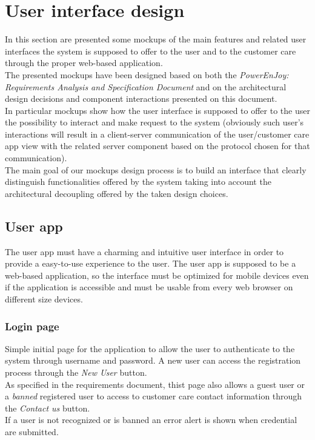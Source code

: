 \section{User interface design}
In this section are presented some mockups of the main features and related user interfaces the system is supposed to offer to the user and to the customer care through the proper web-based application. \\

The presented mockups have been designed based on both the \emph{PowerEnJoy: Requirements Analysis and Specification Document}\cite{RASD} and on the architectural design decisions and component interactions presented on this document. \\
In particular mockups show how the user interface is supposed to offer to the user the possibility to interact and make request to the system (obviously such user's interactions will result in a client-server communication of the user/customer care app view with the related server component based on the protocol chosen for that communication).  \\

The main goal of our mockups design process is to build an interface that clearly distinguish functionalities offered by the system taking into account the architectural decoupling offered by the taken design choices. \\

\clearpage

\subsection{User app}
The user app must have a charming and intuitive user interface in order to provide a easy-to-use experience to the user. The user app is supposed to be a web-based application, so the interface must be optimized for mobile devices even if the application is accessible and must be usable from every web browser on different size devices.

\subsubsection{Login page}
Simple initial page for the application to allow the user to authenticate to the system through username and password. A new user can access the registration process through the \emph{New User} button. \\
As specified in the requirements document, thist page also allows a guest user or a \emph{banned} registered user to access to customer care contact information through the \emph{Contact us} button. \\
If a user is not recognized or is banned an error alert is shown when credential are submitted.

